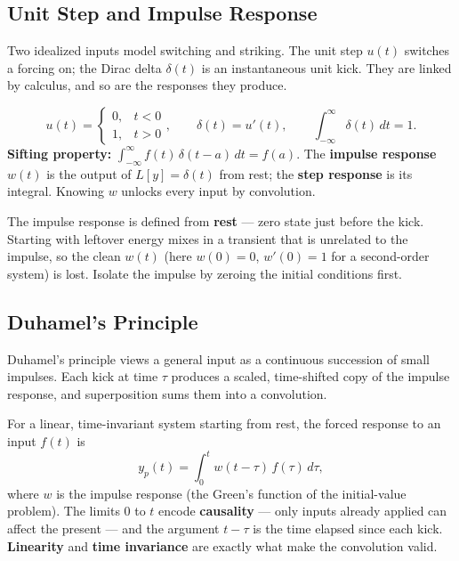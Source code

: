 \subsection{Unit Step and Impulse Response}

Two idealized inputs model switching and striking. The unit step $u(t)$ switches a
forcing on; the Dirac delta $\delta(t)$ is an instantaneous unit kick. They are
linked by calculus, and so are the responses they produce.

\begin{formulabox}
\[ u(t) = \begin{cases} 0, & t<0 \\ 1, & t>0 \end{cases}, \qquad
   \delta(t) = u'(t), \qquad \int_{-\infty}^{\infty}\!\delta(t)\,dt = 1. \]
\textbf{Sifting property:} $\displaystyle\int_{-\infty}^{\infty} f(t)\,\delta(t-a)\,dt = f(a)$.
The \textbf{impulse response} $w(t)$ is the output of $L[y]=\delta(t)$ from rest;
the \textbf{step response} is its integral. Knowing $w$ unlocks every input by
convolution.
\end{formulabox}

\begin{warningbox}
The impulse response is defined from \textbf{rest} --- zero state just before the
kick. Starting with leftover energy mixes in a transient that is unrelated to the
impulse, so the clean $w(t)$ (here $w(0)=0$, $w'(0)=1$ for a second-order system)
is lost. Isolate the impulse by zeroing the initial conditions first.
\end{warningbox}

\subsection{Duhamel's Principle}

Duhamel's principle views a general input as a continuous succession of small
impulses. Each kick at time $\tau$ produces a scaled, time-shifted copy of the
impulse response, and superposition sums them into a convolution.

\begin{methodbox}
For a linear, time-invariant system starting from rest, the forced response to an
input $f(t)$ is
\[ y_p(t) = \int_0^t w(t-\tau)\,f(\tau)\,d\tau, \]
where $w$ is the impulse response (the Green's function of the initial-value
problem). The limits $0$ to $t$ encode \textbf{causality} --- only inputs already
applied can affect the present --- and the argument $t-\tau$ is the time elapsed
since each kick. \textbf{Linearity} and \textbf{time invariance} are exactly what
make the convolution valid.
\end{methodbox}

